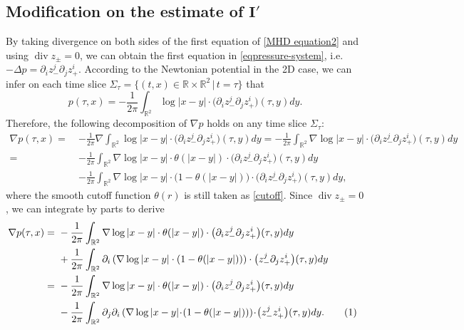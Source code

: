 \documentclass[10pt,reqno]{amsart}
\numberwithin{equation}{section}
\begin{document}
\begin{appendix}
\subsection{Modification on the estimate of $\mathbf{I'}$}
By taking divergence on both sides of the first equation of \eqref{MHD equation2} and using $\operatorname{div} z_{\pm}=0$, we can obtain the first equation in  \eqref{eqpressure-system}, i.e. $-\Delta p=\partial_iz_-^j\partial_jz_+^i$. According to the Newtonian potential in the 2D case, we can infer on each time slice $\Sigma_{\tau}=\{(t,x)\in\mathbb{R}\times\mathbb{R}^2\,|\,t=\tau\}$ that
\begin{equation*} 
	p(\tau,x)=-\frac{1}{2\pi} \int_{\mathbb{R}^2}\log{|x-y|}\cdot \big(\partial_{i}z^{j}_{-}\partial_{j}z^{i}_{+}\big)(\tau,y)dy.
\end{equation*}
Therefore, the following decomposition of $\nabla p$ holds on any time slice $\Sigma_{\tau}$:
\begin{align*}
	\nabla p(\tau,x)=\ &
	-\frac{1}{2\pi}\nabla\int_{\mathbb{R}^2}\log{|x-y|}\cdot\big(\partial_{i}z^{j}_{-}\partial_{j}z^{i}_{+}\big)(\tau,y)dy=
	-\frac{1}{2\pi}\int_{\mathbb{R}^2}\nabla\log{|x-y|}\cdot\big(\partial_{i}z^{j}_{-}\partial_{j}z^{i}_{+}\big)(\tau,y)dy\\
	=\ &-\frac{1}{2\pi}\int_{\mathbb{R}^2}\nabla\log{|x-y|}\cdot \theta(|x-y|)\cdot \big(\partial_{i}z^{j}_{-}\partial_{j}z^{i}_{+}\big)(\tau,y)dy\\
	& -\frac{1}{2\pi}\int_{\mathbb{R}^2}\nabla\log{|x-y|}\cdot \big(1-\theta(|x-y|)\big)\cdot\big(\partial_{i}z^{j}_{-}\partial_{j}z^{i}_{+}\big)(\tau,y)dy,
\end{align*}
where the smooth cutoff function $\theta(r)$ is still taken as \eqref{cutoff}. 
Since $\operatorname{div} z_\pm=0$, we can integrate by parts to derive 
\begin{align*}
	\!\!\!	\nabla p(\tau,x)
	=\ &
	-\frac{1}{2\pi}\int_{\mathbb{R}^2}\nabla\log{|x-y|}\cdot	\theta(|x-y|)\cdot\big(\partial_{i}z^{j}_{-}\partial_{j}z^{i}_{+}\big)(\tau,y)dy\\
	\ &  +\frac{1}{2\pi}\int_{\mathbb{R}^2}\partial_{i}\left(\nabla\log{|x-y|} \cdot\left(1-	\theta(|x-y|)\right)\right)\cdot\big(z^{j}_{-}\partial_{j}z^{i}_{+}\big)(\tau,y)dy\\
	=\ &
	-\frac{1}{2\pi}\int_{\mathbb{R}^2}\nabla\log{|x-y|}\cdot	\theta(|x-y|)\cdot\big(\partial_{i}z^{j}_{-}\partial_{j}z^{i}_{+}\big)(\tau,y)dy\\
	\ &  -\frac{1}{2\pi}\int_{\mathbb{R}^2}\partial_{j}\partial_{i}\left(\nabla\log{|x-y|}\! \cdot\!\left(1-	\theta(|x-y|)\right)\right)\!\cdot\!\big(z^{j}_{-}z^{i}_{+}\big)(\tau,y)dy.\stepcounter{equation}\tag{\theequation}\label{eq:nabla p 2d}

\end{align*}
\end{appendix}
\end{document}
